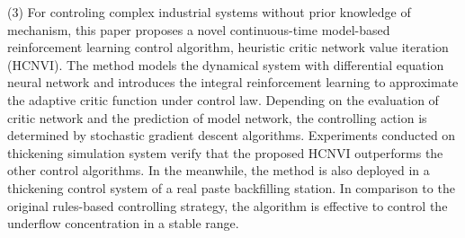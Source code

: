 
(3) For controling complex industrial systems without prior knowledge of mechanism, this paper proposes a novel
continuous-time model-based reinforcement learning control algorithm, heuristic critic network value iteration (HCNVI).
The method models the dynamical system with differential equation neural network and introduces the integral reinforcement learning to approximate the adaptive critic function under control law.
Depending on the evaluation of critic network and the prediction of model network, the controlling action is determined by stochastic gradient descent algorithms.
Experiments conducted on thickening simulation system verify that the proposed HCNVI outperforms the other control algorithms.
In the meanwhile, the method is also deployed in a thickening control system of a real paste backfilling station.
In comparison to the original rules-based controlling strategy, the algorithm is effective to control the underflow concentration in a stable range.

  

